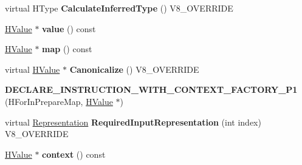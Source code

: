 \begin{DoxyCompactItemize}
\item 
\hypertarget{classv8_1_1internal_1_1_v8___f_i_n_a_l_a7a6782b8660ab150601db2ff28262edd}{}virtual H\+Type {\bfseries Calculate\+Inferred\+Type} () V8\+\_\+\+O\+V\+E\+R\+R\+I\+D\+E\label{classv8_1_1internal_1_1_v8___f_i_n_a_l_a7a6782b8660ab150601db2ff28262edd}

\item 
\hypertarget{classv8_1_1internal_1_1_v8___f_i_n_a_l_a998b3feae0e84bbe080297551603911f}{}\hyperlink{classv8_1_1internal_1_1_h_value}{H\+Value} $\ast$ {\bfseries value} () const \label{classv8_1_1internal_1_1_v8___f_i_n_a_l_a998b3feae0e84bbe080297551603911f}

\item 
\hypertarget{classv8_1_1internal_1_1_v8___f_i_n_a_l_acea171fc87070eb983bebc902b544882}{}\hyperlink{classv8_1_1internal_1_1_h_value}{H\+Value} $\ast$ {\bfseries map} () const \label{classv8_1_1internal_1_1_v8___f_i_n_a_l_acea171fc87070eb983bebc902b544882}

\item 
\hypertarget{classv8_1_1internal_1_1_v8___f_i_n_a_l_aad5f871e0a6782c02e742ec017eca3cd}{}virtual \hyperlink{classv8_1_1internal_1_1_h_value}{H\+Value} $\ast$ {\bfseries Canonicalize} () V8\+\_\+\+O\+V\+E\+R\+R\+I\+D\+E\label{classv8_1_1internal_1_1_v8___f_i_n_a_l_aad5f871e0a6782c02e742ec017eca3cd}

\item 
\hypertarget{classv8_1_1internal_1_1_v8___f_i_n_a_l_ad1f4cfda1b342cdcd017f3c11b896435}{}{\bfseries D\+E\+C\+L\+A\+R\+E\+\_\+\+I\+N\+S\+T\+R\+U\+C\+T\+I\+O\+N\+\_\+\+W\+I\+T\+H\+\_\+\+C\+O\+N\+T\+E\+X\+T\+\_\+\+F\+A\+C\+T\+O\+R\+Y\+\_\+\+P1} (H\+For\+In\+Prepare\+Map, \hyperlink{classv8_1_1internal_1_1_h_value}{H\+Value} $\ast$)\label{classv8_1_1internal_1_1_v8___f_i_n_a_l_ad1f4cfda1b342cdcd017f3c11b896435}

\item 
\hypertarget{classv8_1_1internal_1_1_v8___f_i_n_a_l_a6c6d1f37f40b113d8f4062f1ffff7215}{}virtual \hyperlink{classv8_1_1internal_1_1_representation}{Representation} {\bfseries Required\+Input\+Representation} (int index) V8\+\_\+\+O\+V\+E\+R\+R\+I\+D\+E\label{classv8_1_1internal_1_1_v8___f_i_n_a_l_a6c6d1f37f40b113d8f4062f1ffff7215}

\item 
\hypertarget{classv8_1_1internal_1_1_v8___f_i_n_a_l_a8294bece2df148267ec52228e2139030}{}\hyperlink{classv8_1_1internal_1_1_h_value}{H\+Value} $\ast$ {\bfseries context} () const \label{classv8_1_1internal_1_1_v8___f_i_n_a_l_a8294bece2df148267ec52228e2139030}


\end{DoxyCompactItemize}
